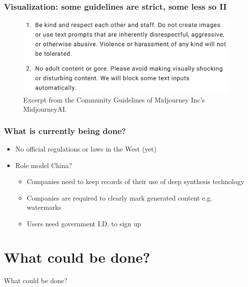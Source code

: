 \documentclass[
	11pt, compress%
]{beamer}
\begin{document}
\begin{frame}
\frametitle{Visualization: some guidelines are strict, some less so II}
\begin{figure}
\includegraphics[width=0.6\linewidth]{Images/CommunityGuidelinesMidjourneyAI.png}
\caption{\tiny Excerpt from the Community Guidelines of Midjourney Inc's MidjourneyAI\cite{MidJourneyTOS}.}
\end{figure}
\end{frame}

\begin{frame}
	\frametitle{What is currently being done?}

	\begin{itemize}
		\setlength\itemsep{1,3em}

	\item No official regulations or laws in the West (yet)
	\item Role model China?
	\begin{itemize}
		\setlength\itemsep{0,5em}
		\item Companies need to keep records of their use of deep synthesis technology
		\item Companies are required to clearly mark generated content e.g. watermarks
		\item Users need government I.D. to sign up
	\end{itemize}
\end{itemize}
\end{frame}

\section{What could be done?}

\begin{frame}
\begin{center}
	\huge What could be done?
\end{center}
\end{frame}
\end{document}
